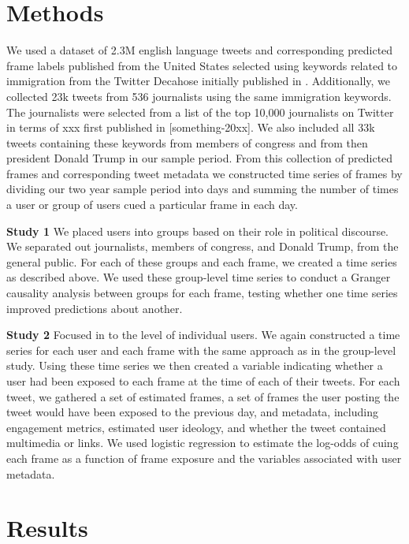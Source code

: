 \documentclass[a4paper,12pt]{article}
\begin{document}
\section*{Methods}

    We used a dataset of 2.3M english language tweets and corresponding predicted frame labels published from the United States selected using keywords related to immigration from the Twitter Decahose initially published in \cite{mendelsohn_modeling_2021}. Additionally, we collected 23k tweets from 536 journalists using the same immigration keywords. The journalists were selected from a list of the top 10,000 journalists on Twitter in terms of xxx first published in [something-20xx]. We also included all 33k tweets containing these keywords from members of congress and from then president Donald Trump in our sample period. From this collection of predicted frames and corresponding tweet metadata we constructed time series of frames by dividing our two year sample period into days and summing the number of times a user or group of users cued a particular frame in each day.
    
    \textbf{Study 1} We placed users into groups based on their role in political discourse. We separated out journalists, members of congress, and Donald Trump, from the general public. For each of these groups and each frame, we created a time series as described above. We used these group-level time series to conduct a Granger causality analysis between groups for each frame, testing whether one time series improved predictions about another.
        
    \textbf{Study 2} Focused in to the level of individual users. We again constructed a time series for each user and each frame with the same approach as in the group-level study. Using these time series we then created a variable indicating whether a user had been exposed to each frame at the time of each of their tweets. For each tweet, we gathered a set of estimated frames, a set of frames the user posting the tweet would have been exposed to the previous day, and metadata, including engagement metrics, estimated user ideology, and whether the tweet contained multimedia or links. We used logistic regression to estimate the log-odds of cuing each frame as a function of frame exposure and the variables associated with user metadata.

\section*{Results}
\end{document}
